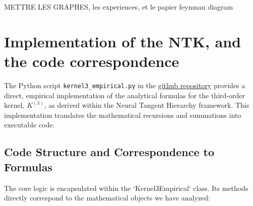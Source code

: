 \documentclass[a4paper]{article}
\begin{document}
METTRE LES GRAPHES, les experiences, et le papier feynman diagram



\section{Implementation of the NTK, and the code correspondence}

The Python script \texttt{kernel3\_empirical.py} in the \href{https://github.com/janisaiad/DeNN-NTK}{github repository} provides a direct, empirical implementation of the analytical formulas for the third-order kernel, $K^{(3)}$, as derived within the Neural Tangent Hierarchy framework. This implementation translates the mathematical recursions and summations into executable code.

\subsection{Code Structure and Correspondence to Formulas}
The core logic is encapsulated within the `Kernel3Empirical` class. Its methods directly correspond to the mathematical objects we have analyzed:
\end{document}
